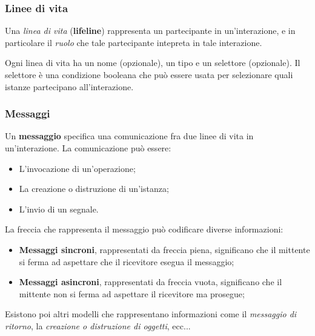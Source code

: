 \documentclass[a4paper,11pt]{article}
\begin{document}
\subsubsection{Linee di vita}
Una \textit{linea di vita} (\textbf{lifeline}) rappresenta un partecipante in un'interazione, e in particolare il \textit{ruolo} che tale partecipante intepreta in tale interazione.

Ogni linea di vita ha un nome (opzionale), un tipo e un selettore (opzionale). Il selettore è una condizione booleana che può essere usata per selezionare quali istanze partecipano all'interazione.

\subsubsection{Messaggi}
Un \textbf{messaggio} specifica una comunicazione fra due linee di vita in un'interazione.
La comunicazione può essere:
\begin{itemize}
	\item L'invocazione di un'operazione;
	\item La creazione o distruzione di un'istanza;
	\item L'invio di un segnale.
\end{itemize}

La freccia che rappresenta il messaggio può codificare diverse informazioni:
\begin{itemize}
	\item \textbf{Messaggi sincroni}, rappresentati da freccia piena, significano che il mittente si ferma ad aspettare che il ricevitore esegua il messaggio;
	\item \textbf{Messaggi asincroni}, rappresentati da freccia vuota, significano che il mittente non si ferma ad aspettare il ricevitore ma prosegue;
\end{itemize}

Esistono poi altri modelli che rappresentano informazioni come il \textit{messaggio di ritorno}, la \textit{creazione o distruzione di oggetti}, ecc...
\end{document}
